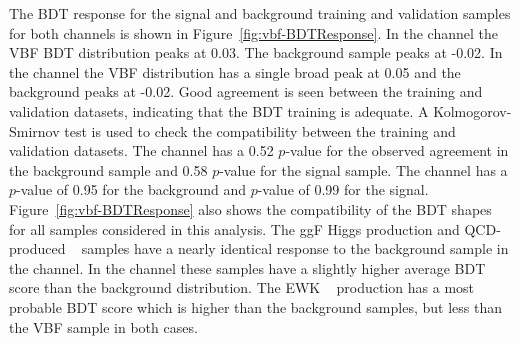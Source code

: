 
The BDT response for  the signal and background training and validation
samples for both channels is shown in Figure~\ref{fig:vbf-BDTResponse}.
In the \fourcentral channel the VBF \Hbb BDT distribution peaks at 0.03.
The background sample peaks at -0.02.  In the \twocentral channel the
VBF \Hbb distribution has a single broad peak at 0.05 and the
background peaks at -0.02. Good agreement is seen between the training
and validation datasets, indicating that the BDT training is adequate.
A Kolmogorov-Smirnov test is used to check the compatibility between
the training and validation datasets.  The \twocentral channel has
a 0.52 $p$-value for the observed agreement in the background sample
and 0.58 $p$-value for the signal sample. The \fourcentral channel has
a $p$-value of 0.95 for the background and $p$-value of 0.99 for the signal.
Figure~\ref{fig:vbf-BDTResponse} also shows the compatibility of the BDT
shapes for all samples considered in this analysis.
The ggF Higgs production and QCD-produced \zjets ~ samples have a
nearly identical response to the background sample in the \fourcentral channel.
In the \twocentral channel these samples have a slightly higher average BDT score than the background distribution.
The EWK \zjets ~ production has a most probable BDT score which is higher than the
background samples, but less than the VBF \Hbb sample in both cases.



